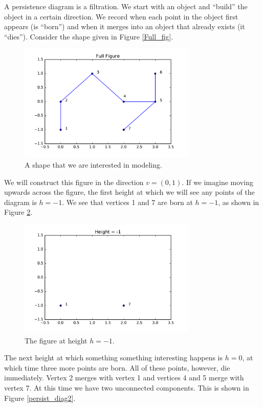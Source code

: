 \documentclass[codesnippet]{jss}
\begin{document}
A persistence diagram is a filtration.  We start with an object and ``build'' the object in a certain direction.  We record when each point in the object first appears (is ``born'') and when it merges into an object that already exists (it ``dies'').  Consider the shape given in Figure \ref{Full_fig}.
\begin{figure}
\centering
\includegraphics[width = 0.75\textwidth]{../full_fig.pdf}
\caption{\label{Full_Fig} A shape that we are interested in modeling.}
\end{figure}
We will construct this figure in the direction $v = (0,1)$.  If we imagine moving upwards across the figure, the first height at which we will see any points of the diagram is $h=-1$.  We see that vertices 1 and 7 are born at $h = -1$, as shown in Figure \ref{h1}.
\begin{figure}
\centering
\includegraphics[width = 0.75\textwidth]{../h1.pdf}
\caption{\label{h1} The figure at height $h = -1$.}
\end{figure}
The next height at which something something interesting happens is $h = 0$, at which time three more points are born.  All of these points, however, die immediately.  Vertex 2 merges with vertex 1 and vertices 4 and 5 merge with vertex 7.  At this time we have two unconnected components. This is shown in Figure \ref{persist_diag2}.
\end{document}
